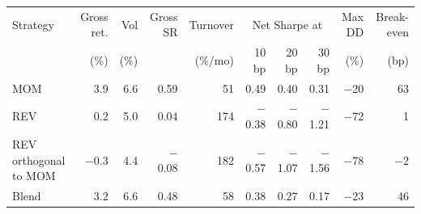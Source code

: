 \begin{tabular}{lrrrrrrrrr}
\toprule
Strategy & Gross ret. & Vol & Gross SR & Turnover & \multicolumn{3}{c}{Net Sharpe at} & Max DD & Break-even \\ & (\%) & (\%) & & (\%/mo) & 10 bp & 20 bp & 30 bp & (\%) & (bp) \\
\midrule
MOM & 3.9 & 6.6 & 0.59 & 51 & 0.49 & 0.40 & 0.31 & $-$20 & 63 \\
REV & 0.2 & 5.0 & 0.04 & 174 & $-$0.38 & $-$0.80 & $-$1.21 & $-$72 & 1 \\
REV orthogonal to MOM & $-$0.3 & 4.4 & $-$0.08 & 182 & $-$0.57 & $-$1.07 & $-$1.56 & $-$78 & $-$2 \\
Blend & 3.2 & 6.6 & 0.48 & 58 & 0.38 & 0.27 & 0.17 & $-$23 & 46 \\
\bottomrule
\end{tabular}
